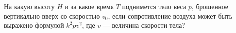 На какую высоту $H$ и за какое время $T$ поднимется тело веса $p$,
брошенное вертикально вверх со скоростью $v_{0}$, если сопротивление
воздуха может быть выражено формулой $k^2pv^2$, где $v$ --- величина
скорости тела?

